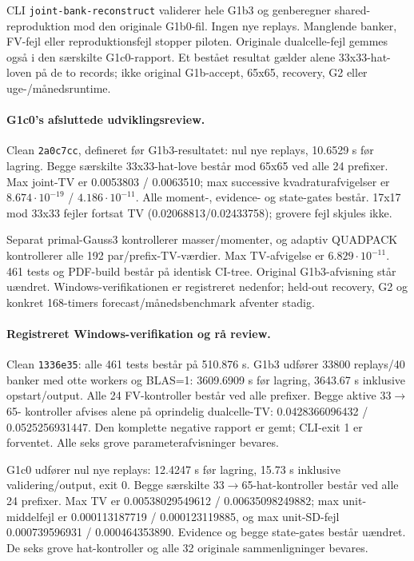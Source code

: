 CLI \texttt{joint-bank-reconstruct} validerer hele G1b3 og genberegner
shared-reproduktion mod den originale G1b0-fil. Ingen nye replays.
Manglende banker, FV-fejl eller reproduktionsfejl stopper piloten.
Originale dualcelle-fejl gemmes også i den særskilte G1c0-rapport.
Et bestået resultat gælder alene 33x33-hat-loven på de to records;
ikke original G1b-accept, 65x65, recovery, G2 eller uge-/månedsruntime.

\paragraph{G1c0's afsluttede udviklingsreview.}
Clean \texttt{2a0c7cc}, defineret før G1b3-resultatet: nul nye replays,
10.6529 s før lagring. Begge særskilte 33x33-hat-love består mod
65x65 ved alle 24 prefixer. Max joint-TV er
0.0053803 / 0.0063510;
max successive kvadraturafvigelser er
\( 8.674\cdot10^{-19} \) /
\( 4.186\cdot10^{-11} \).
Alle moment-, evidence- og state-gates består. 17x17 mod 33x33 fejler
fortsat TV (0.02068813/0.02433758); grovere fejl skjules ikke.

Separat primal-Gauss3 kontrollerer masser/momenter, og adaptiv QUADPACK
kontrollerer alle 192 par/prefix-TV-værdier. Max TV-afvigelse er
\( 6.829\cdot10^{-11} \).
461 tests og PDF-build består på identisk CI-tree. Original G1b3-afvisning
står uændret. Windows-verifikationen er registreret nedenfor; held-out recovery,
G2 og konkret 168-timers forecast/månedsbenchmark afventer stadig.

\paragraph{Registreret Windows-verifikation og rå review.}
Clean \texttt{1336e35}: alle 461 tests består på 510.876 s.
G1b3 udfører 33800 replays/40 banker med otte workers og BLAS=1:
3609.6909 s før lagring, 3643.67 s inklusive opstart/output.
Alle 24 FV-kontroller består ved alle prefixer. Begge aktive 33\(\to\)65-
kontroller afvises alene på oprindelig dualcelle-TV:
0.0428366096432 / 0.0525256931447. Den komplette negative rapport er gemt;
CLI-exit 1 er forventet. Alle seks grove parameterafvisninger bevares.

G1c0 udfører nul nye replays: 12.4247 s før lagring, 15.73 s inklusive
validering/output, exit 0. Begge særskilte 33\(\to\)65-hat-kontroller
består ved alle 24 prefixer. Max TV er 0.00538029549612 / 0.00635098249882;
max unit-middelfejl er 0.000113187719 / 0.000123119885, og max unit-SD-fejl
0.000739596931 / 0.000464353890. Evidence og begge state-gates består uændret.
De seks grove hat-kontroller og alle 32 originale sammenligninger bevares.

